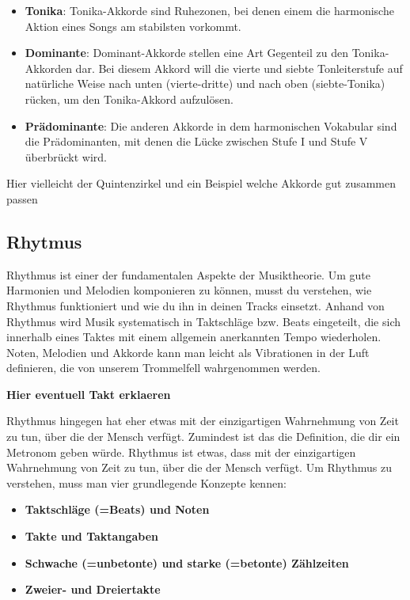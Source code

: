 \begin{itemize}
    \item \textbf{Tonika}: Tonika-Akkorde sind Ruhezonen, bei denen einem die harmonische Aktion eines 
    Songs am stabilsten vorkommt.
    \item \textbf{Dominante}: Dominant-Akkorde stellen eine Art Gegenteil zu den Tonika-Akkorden dar. 
    Bei diesem Akkord will die vierte und siebte Tonleiterstufe auf natürliche Weise nach unten 
    (vierte-dritte) und nach oben (siebte-Tonika) rücken, um den Tonika-Akkord aufzulösen.
    \item \textbf{Prädominante}: Die anderen Akkorde in dem harmonischen Vokabular sind die Prädominanten, 
    mit denen die Lücke zwischen Stufe I und Stufe V überbrückt wird.
\end{itemize}

Hier vielleicht der Quintenzirkel und ein Beispiel welche Akkorde gut zusammen passen

\subsection{Rhytmus}
Rhythmus ist einer der fundamentalen Aspekte der Musiktheorie. Um gute Harmonien und Melodien komponieren zu können, musst du verstehen, wie Rhythmus funktioniert und wie du ihn in deinen Tracks einsetzt. Anhand von Rhythmus wird Musik systematisch in Taktschläge bzw. Beats eingeteilt, die sich innerhalb eines Taktes mit einem allgemein anerkannten Tempo wiederholen. Noten, Melodien und Akkorde kann man leicht als Vibrationen in der Luft definieren, die von unserem Trommelfell wahrgenommen werden.

\textbf{Hier  eventuell Takt erklaeren}

Rhythmus hingegen hat eher etwas mit der einzigartigen Wahrnehmung von Zeit zu tun, über die der Mensch verfügt. Zumindest ist das die Definition, die dir ein Metronom geben würde. Rhythmus ist etwas, dass mit der einzigartigen Wahrnehmung von Zeit zu tun, über die der Mensch verfügt. Um Rhythmus zu verstehen, muss man vier grundlegende Konzepte kennen:

\begin{itemize}
    \item \textbf{Taktschläge (=Beats) und Noten}
    \item \textbf{Takte und Taktangaben}
    \item \textbf{Schwache (=unbetonte) und starke (=betonte) Zählzeiten}
    \item \textbf{Zweier- und Dreiertakte}
\end{itemize}

